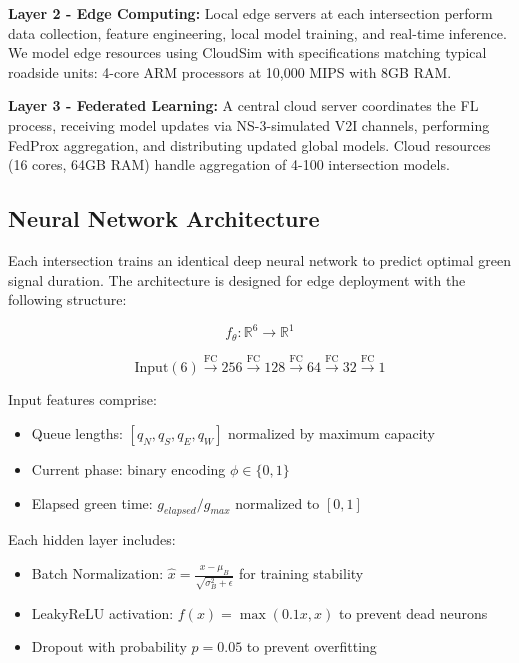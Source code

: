\documentclass[conference]{IEEEtran}
\begin{document}
\textbf{Layer 2 - Edge Computing:} Local edge servers at each intersection perform data collection, feature engineering, local model training, and real-time inference. We model edge resources using CloudSim with specifications matching typical roadside units: 4-core ARM processors at 10,000 MIPS with 8GB RAM.

\textbf{Layer 3 - Federated Learning:} A central cloud server coordinates the FL process, receiving model updates via NS-3-simulated V2I channels, performing FedProx aggregation, and distributing updated global models. Cloud resources (16 cores, 64GB RAM) handle aggregation of 4-100 intersection models.

\subsection{Neural Network Architecture}
Each intersection trains an identical deep neural network to predict optimal green signal duration. The architecture is designed for edge deployment with the following structure:

\begin{equation}
f_\theta: \mathbb{R}^6 \rightarrow \mathbb{R}^1
\end{equation}

\begin{equation}
\text{Input}(6) \xrightarrow{\text{FC}} 256 \xrightarrow{\text{FC}} 128 \xrightarrow{\text{FC}} 64 \xrightarrow{\text{FC}} 32 \xrightarrow{\text{FC}} 1
\end{equation}

Input features comprise:
\begin{itemize}
    \item Queue lengths: $[q_N, q_S, q_E, q_W]$ normalized by maximum capacity
    \item Current phase: binary encoding $\phi \in \{0, 1\}$
    \item Elapsed green time: $g_{elapsed} / g_{max}$ normalized to $[0, 1]$
\end{itemize}

Each hidden layer includes:
\begin{itemize}
    \item Batch Normalization: $\hat{x} = \frac{x - \mu_B}{\sqrt{\sigma_B^2 + \epsilon}}$ for training stability
    \item LeakyReLU activation: $f(x) = \max(0.1x, x)$ to prevent dead neurons
    \item Dropout with probability $p = 0.05$ to prevent overfitting
\end{itemize}
\end{document}
